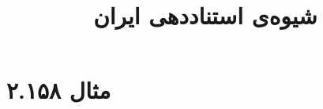 \documentclass[a4paper,10pt]{article}
\begin{document}
\title{شیوه‌ی استناددهی ایران}
\author{}
\date{}
\maketitle



\section*{مثال ۲.۱۵۸}

\cite{سمیعی1384}\\
\cite{سرشار1385}\\
\\
\\





\end{document}
